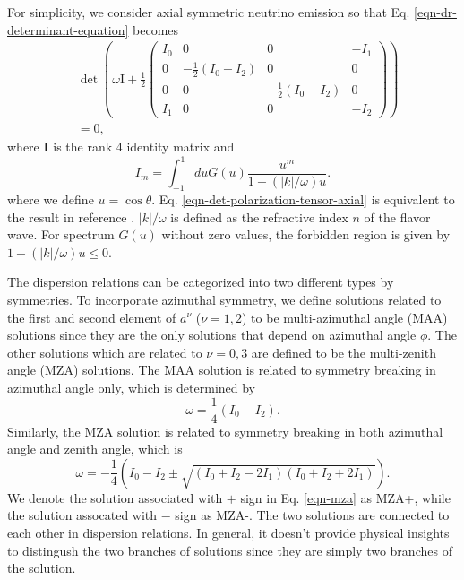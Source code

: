 \documentclass[%
preprint,
 amsmath,amssymb,
 aps,
 prd
]{revtex4-1}
\begin{document}
For simplicity, we consider axial symmetric neutrino emission so that Eq. \eqref{eqn-dr-determinant-equation} becomes
\begin{align}
&\det \left( \omega \mathrm{I} + \frac{1}{2}
\begin{pmatrix}
   I_0 & 0 & 0 & -I_1 \\
   0 & -\frac{1}{2} (I_0 - I_2) & 0 & 0 \\
   0 & 0 & -\frac{1}{2} (I_0 - I_2) & 0 \\
   I_1 & 0 & 0 & -I_2
\end{pmatrix}\right) \nonumber\\
&=0,
\label{eqn-det-polarization-tensor-axial}
\end{align}
where $\mathbf I$ is the rank 4 identity matrix and
\begin{equation}
   I_m =\int_{-1}^{1} d u G(u) \frac{u^m}{1 -  \left(\lvert k\rvert /\omega\right) u }.
\end{equation}
where we define $u=\cos\theta$. Eq. \eqref{eqn-det-polarization-tensor-axial} is equivalent to the result in reference . $\lvert k \rvert /\omega$ is defined as the refractive index $n$ of the flavor wave. For spectrum $G(u)$ without zero values, the forbidden region is given by $1 -  \left(\lvert k\rvert /\omega\right) u\leq 0$. 

The dispersion relations can be categorized into two different types by symmetries. To incorporate azimuthal symmetry, we define solutions related to the first and second element of $a^\nu$ ($\nu=1,2$) to be multi-azimuthal angle (MAA) solutions since they are the only solutions that depend on azimuthal angle $\phi$. The other solutions which are related to $\nu=0,3$ are defined to be the multi-zenith angle (MZA) solutions. The MAA solution is related to symmetry breaking in azimuthal angle only, which is determined by
\begin{equation}
   \omega = \frac{1}{4}(I_0 - I_2).
   \label{eqn-maa}
\end{equation}
Similarly, the MZA solution is related to symmetry breaking in both azimuthal angle and zenith angle, which is
\begin{equation}
\omega = - \frac{1}{4} \left( I_0 - I_2 \pm \sqrt{ (I_0 + I_2 - 2 I_1) (I_0 + I_2 + 2 I_1) } \right).
\label{eqn-mza}
\end{equation}
We denote the solution associated with $+$ sign in Eq. \eqref{eqn-mza} as MZA+, while the solution assocated with $-$ sign as MZA-. The two solutions are connected to each other in dispersion relations. In general, it doesn't provide physical insights to distingush the two branches of solutions since they are simply two branches of the solution.
\end{document}
